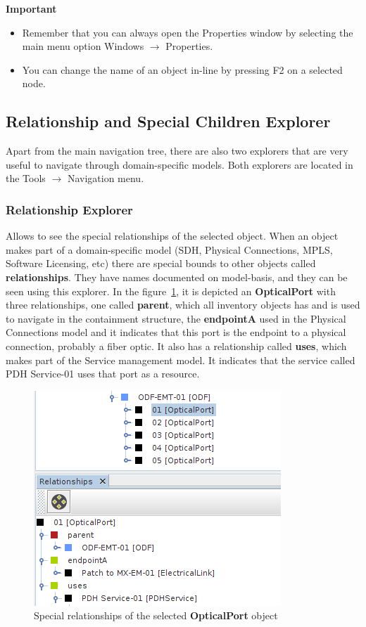 \documentclass[a4paper]{article}
\begin{document}
	\begin{framed} {\large \textbf{Important}}
		\begin{itemize}
			\item Remember that you can always open the Properties window by selecting the main menu option Windows $\rightarrow$ Properties.
			\item You can change the name of an object in-line by pressing F2 on a selected node.
		\end{itemize}
	\end{framed}
	\subsection{Relationship and Special Children Explorer} \label{sec:extra_explorers}
	Apart from the main navigation tree, there are also two explorers that are very useful to navigate through domain-specific models. Both explorers are located in the Tools $\rightarrow$ Navigation menu.

	\subsubsection{Relationship Explorer} \label{sec:extra_explorers_relationship_explorer}
		Allows to see the special relationships of the selected object. When an object makes part of a domain-specific model (SDH, Physical Connections, MPLS, Software Licensing, etc) there are special bounds to other objects called \textbf{relationships}. They have names documented on model-basis, and they can be seen using this explorer. In the figure~\ref{fig:navigation_tree_relationship_explorer}, it is depicted an \textbf{OpticalPort} with three relationships, one called \textbf{parent}, which all inventory objects has and is used to navigate in the containment structure, the \textbf{endpointA} used in the Physical Connections model and it indicates that this port is the endpoint to a physical connection, probably a fiber optic. It also has a relationship called \textbf{uses}, which makes part of the Service management model. It indicates that the service called PDH Service-01 uses that port as a resource.
		
		\begin{figure}[h!]
			\centering
			\includegraphics[width=0.4\linewidth]{img/navigation_tree_relationship_explorer.png}
			\caption{Special relationships of the selected \textbf{OpticalPort} object}
			\label{fig:navigation_tree_relationship_explorer}
		\end{figure}
		
\end{document}
